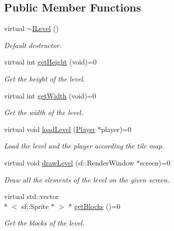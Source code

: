 \subsection*{Public Member Functions}
\begin{DoxyCompactItemize}
\item 
\hypertarget{class_i_level_a736c3cb25ccf5c3f8a79522eef06351d}{virtual \hyperlink{class_i_level_a736c3cb25ccf5c3f8a79522eef06351d}{$\sim$\-I\-Level} ()}\label{class_i_level_a736c3cb25ccf5c3f8a79522eef06351d}

\begin{DoxyCompactList}\small\item\em Default destructor. \end{DoxyCompactList}\item 
virtual int \hyperlink{class_i_level_a192bb8106e09fb68794711b048ca748d}{get\-Height} (void)=0
\begin{DoxyCompactList}\small\item\em Get the height of the level. \end{DoxyCompactList}\item 
virtual int \hyperlink{class_i_level_a91daa2f5b760da916b348470cd5ed66e}{get\-Width} (void)=0
\begin{DoxyCompactList}\small\item\em Get the width of the level. \end{DoxyCompactList}\item 
virtual void \hyperlink{class_i_level_ae5c21f7cc2cc8757ef50b767d4787138}{load\-Level} (\hyperlink{class_player}{Player} $\ast$player)=0
\begin{DoxyCompactList}\small\item\em Load the level and the player according the tile map. \end{DoxyCompactList}\item 
virtual void \hyperlink{class_i_level_a7e37723d1806e1c137c332fd4b28ba51}{draw\-Level} (sf\-::\-Render\-Window $\ast$screen)=0
\begin{DoxyCompactList}\small\item\em Draw all the elements of the level on the given screen. \end{DoxyCompactList}\item 
virtual std\-::vector\\*
$<$ sf\-::\-Sprite $\ast$ $>$ $\ast$ \hyperlink{class_i_level_a9d3f0ff762fbb04038eac9de4531bc45}{get\-Blocks} ()=0
\begin{DoxyCompactList}\small\item\em Get the blocks of the level. \end{DoxyCompactList}\item 

\end{DoxyCompactItemize}
